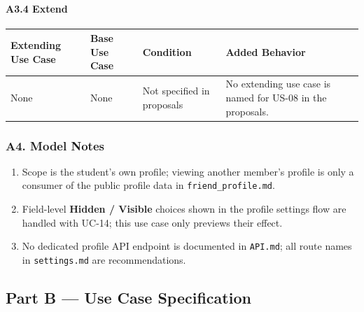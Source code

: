 \documentclass[12pt]{article}
\renewcommand{\baselinestretch}{1.5}
\begin{document}
\hypertarget{sec:a3-4-extend}{}
\paragraph*{A3.4 Extend}
\par\medskip

\begingroup
\small
\renewcommand{\baselinestretch}{1.0}\selectfont
\renewcommand{\arraystretch}{1.15}
\setlength{\tabcolsep}{6pt}
\begin{longtable}{|>{\raggedright\arraybackslash}p{}|>{\raggedright\arraybackslash}p{}|>{\raggedright\arraybackslash}p{}|>{\raggedright\arraybackslash}p{}|}
\hline
\textbf{Extending Use Case} & \textbf{Base Use Case} & \textbf{Condition} & \textbf{Added Behavior} \\ \hline
\endhead
None & None & Not specified in proposals & No extending use case is named for US-08 in the proposals. \\ \hline
\end{longtable}
\endgroup
\par\medskip

\hypertarget{sec:a4-model-notes}{}
\subsubsection*{A4. Model Notes}
\par\medskip

\begin{enumerate}
\item Scope is the student's own profile; viewing another member's profile is only a consumer of the public profile data in \texttt{friend\_profile.md}.
\item Field-level \textbf{Hidden / Visible} choices shown in the profile settings flow are handled with UC-14; this use case only previews their effect.
\item No dedicated profile API endpoint is documented in \texttt{API.md}; all route names in \texttt{settings.md} are recommendations.
\end{enumerate}
\par\medskip

\hypertarget{sec:part-b-use-case-specification}{}
\subsection*{Part B --- Use Case Specification}
\par\medskip
\end{document}
